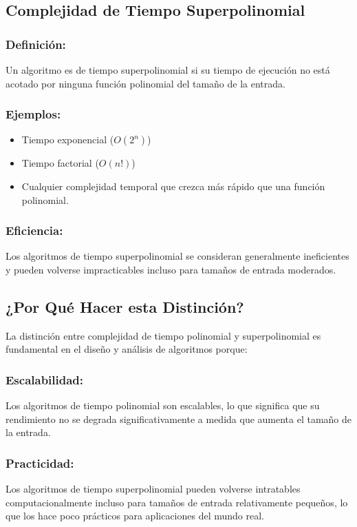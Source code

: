 \documentclass[12pt]{article}
\begin{document}
    \subsection{Complejidad de Tiempo Superpolinomial}

    \subsubsection{Definición:}
    Un algoritmo es de tiempo superpolinomial si su tiempo de ejecución no está acotado por ninguna función polinomial del tamaño de la entrada.

    \subsubsection{Ejemplos:}
    \begin{itemize}
        \item Tiempo exponencial ($O(2^n)$)
        \item Tiempo factorial ($O(n!)$)
        \item Cualquier complejidad temporal que crezca más rápido que una función polinomial.
    \end{itemize}

    \subsubsection{Eficiencia:}
    Los algoritmos de tiempo superpolinomial se consideran generalmente ineficientes y pueden volverse impracticables incluso para tamaños de entrada moderados.

    \subsection{¿Por Qué Hacer esta Distinción?}
    La distinción entre complejidad de tiempo polinomial y superpolinomial es fundamental en el diseño y análisis de algoritmos porque:

    \subsubsection{Escalabilidad:}
    Los algoritmos de tiempo polinomial son escalables, lo que significa que su rendimiento no se degrada significativamente a medida que aumenta el tamaño de la entrada.

    \subsubsection{Practicidad:}
    Los algoritmos de tiempo superpolinomial pueden volverse intratables computacionalmente incluso para tamaños de entrada relativamente pequeños, lo que los hace poco prácticos para aplicaciones del mundo real.
\end{document}
